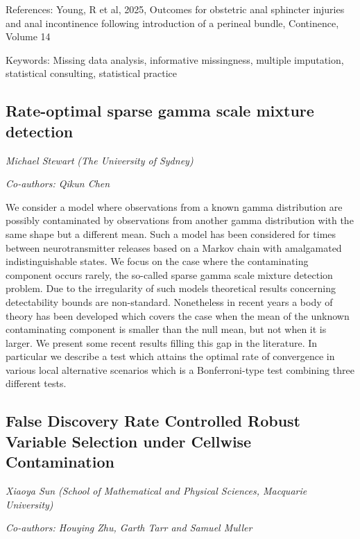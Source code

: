 \documentclass[
]{scrreprt}
\begin{document}
References: Young, R et al, 2025, Outcomes for obstetric anal sphincter
injuries and anal incontinence following introduction of a perineal
bundle, Continence, Volume 14

Keywords: Missing data analysis, informative missingness, multiple
imputation, statistical consulting, statistical practice

\subsection{Rate-optimal sparse gamma scale mixture
detection}\label{rate-optimal-sparse-gamma-scale-mixture-detection}

\emph{Michael Stewart} \emph{(The University of
Sydney)}

\emph{Co-authors: Qikun Chen}

\setlength{\parskip}{0.5em}

We consider a model where observations from a known gamma distribution
are possibly contaminated by observations from another gamma
distribution with the same shape but a different mean. Such a model has
been considered for times between neurotransmitter releases based on a
Markov chain with amalgamated indistinguishable states. We focus on the
case where the contaminating component occurs rarely, the so-called
sparse gamma scale mixture detection problem. Due to the irregularity of
such models theoretical results concerning detectability bounds are
non-standard. Nonetheless in recent years a body of theory has been
developed which covers the case when the mean of the unknown
contaminating component is smaller than the null mean, but not when it
is larger. We present some recent results filling this gap in the
literature. In particular we describe a test which attains the optimal
rate of convergence in various local alternative scenarios which is a
Bonferroni-type test combining three different tests.

\subsection{False Discovery Rate Controlled Robust Variable Selection
under Cellwise
Contamination}\label{false-discovery-rate-controlled-robust-variable-selection-under-cellwise-contamination}

\emph{Xiaoya Sun} \emph{(School of Mathematical and
Physical Sciences, Macquarie University)}

\emph{Co-authors: Houying Zhu, Garth Tarr and Samuel Muller}
\end{document}
